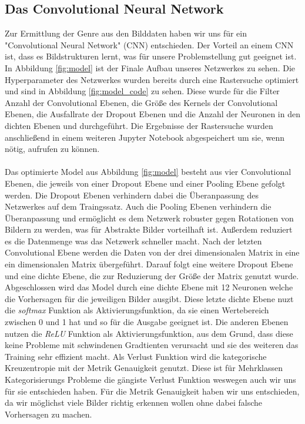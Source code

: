 \subsection{Das Convolutional Neural Network}
Zur Ermittlung der Genre aus den Bilddaten haben wir uns für ein "Convolutional Neural Network" (CNN) entschieden.
Der Vorteil an einem CNN ist, dass es Bildstrukturen lernt, was für unsere Problemstellung gut geeignet ist.
In Abbildung \ref{fig:model} ist der Finale Aufbau unseres Netzwerkes zu sehen.
Die Hyperparameter des Netzwerkes wurden bereits durch eine Rastersuche optimiert und sind in Abbildung \ref{fig:model_code} zu sehen.
Diese wurde für die Filter Anzahl der Convolutional Ebenen, die Größe des Kernels der Convolutional Ebenen, die Ausfallrate der Dropout Ebenen und die Anzahl der Neuronen in den dichten Ebenen und durchgeführt.
Die Ergebnisse der Rastersuche wurden anschließend in einem weiteren Jupyter Notebook abgespeichert um sie, wenn nötig, aufrufen zu können.
\\\\
Das optimierte Model aus Abbildung \ref{fig:model} besteht aus vier Convolutional Ebenen, die jeweils von einer Dropout Ebene und einer Pooling Ebene gefolgt werden.
Die Dropout Ebenen verhindern dabei die Überanpassung des Netzwerkes auf dem Traingssatz.
Auch die Pooling Ebenen verhindern die Überanpassung und ermöglicht es dem Netzwerk robuster gegen Rotationen von Bildern zu werden, was für Abstrakte Bilder vorteilhaft ist.
Außerdem reduziert es die Datenmenge was das Netzwerk schneller macht.
Nach der letzten Convolutional Ebene werden die Daten von der drei dimensionalen Matrix in eine ein dimensionalen Matrix übergeführt.
Darauf folgt eine weitere Dropout Ebene und eine dichte Ebene, die zur Reduzierung der Größe der Matrix genutzt wurde.
Abgeschlossen wird das Model durch eine dichte Ebene mit 12 Neuronen welche die Vorhersagen für die jeweiligen Bilder ausgibt.
Diese letzte dichte Ebene nuzt die \textit{softmax} Funktion als Aktivierungsfunktion, da sie einen Wertebereich zwischen 0 und 1 hat und so für die Ausgabe geeignet ist.
Die anderen Ebenen nutzen die \textit{ReLU} Funktion als Aktivierungsfunktion, aus dem Grund, dass diese keine Probleme mit schwindenen Gradtienten verursacht und sie des weiteren das Training sehr effizient macht.
Als Verlust Funktion wird die kategorische Kreuzentropie mit der Metrik Genauigkeit genutzt.
Diese ist für Mehrklassen Kategorisierungs Probleme die gängiste Verlust Funktion weswegen auch wir uns für sie entschieden haben.
Für die Metrik Genauigkeit haben wir uns entschieden, da wir möglichst viele Bilder richtig erkennen wollen ohne dabei falsche Vorhersagen zu machen.
